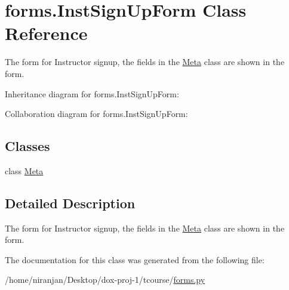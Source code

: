 \hypertarget{classforms_1_1_inst_sign_up_form}{}\section{forms.\+Inst\+Sign\+Up\+Form Class Reference}
\label{classforms_1_1_inst_sign_up_form}


The form for Instructor signup, the fields in the \hyperlink{classforms_1_1_inst_sign_up_form_1_1_meta}{Meta} class are shown in the form.  




Inheritance diagram for forms.\+Inst\+Sign\+Up\+Form\+:


Collaboration diagram for forms.\+Inst\+Sign\+Up\+Form\+:
\subsection*{Classes}
\begin{DoxyCompactItemize}
\item 
class \hyperlink{classforms_1_1_inst_sign_up_form_1_1_meta}{Meta}
\end{DoxyCompactItemize}


\subsection{Detailed Description}
The form for Instructor signup, the fields in the \hyperlink{classforms_1_1_inst_sign_up_form_1_1_meta}{Meta} class are shown in the form. 

The documentation for this class was generated from the following file\+:\begin{DoxyCompactItemize}
\item 
/home/niranjan/\+Desktop/dox-\/proj-\/1/tcourse/\hyperlink{forms_8py}{forms.\+py}\end{DoxyCompactItemize}
